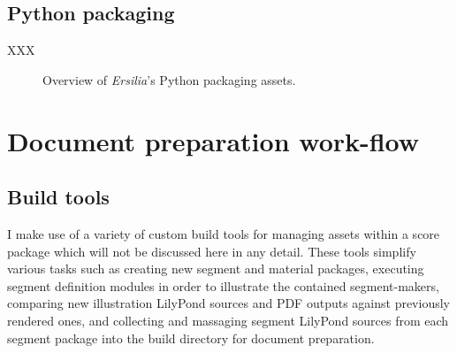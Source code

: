 \subsection{Python packaging}
\label{ssec:python-packaging}

XXX

\begin{figure}[h!]
\begin{singlespacing}
\vspace{-0.5\baselineskip}
\end{singlespacing}
\caption{Overview of \emph{Ersilia}'s Python packaging assets.}
\end{figure}

\section{Document preparation work-flow}
\label{sec:document-preparation-work-flow}

\subsection{Build tools}
\label{ssec:build-tools}

I make use of a variety of custom build tools for managing assets within a
score package which will not be discussed here in any detail. These tools
simplify various tasks such as creating new segment and material packages,
executing segment definition modules in order to illustrate the contained
segment-makers, comparing new illustration LilyPond sources and PDF outputs
against previously rendered ones, and collecting and massaging segment LilyPond
sources from each segment package into the build directory for document
preparation.

